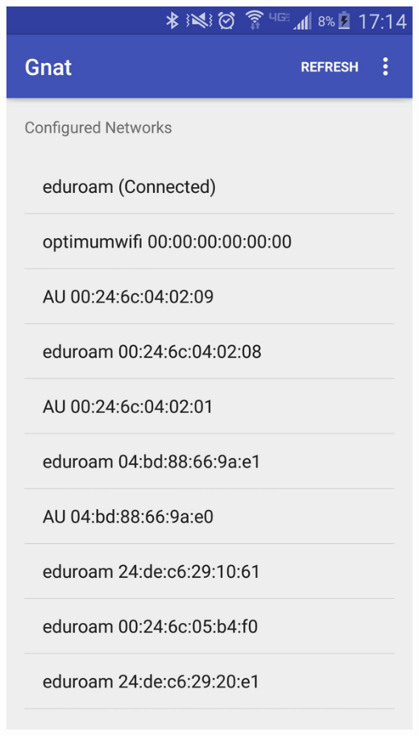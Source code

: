 \documentclass{scrreprt}
\begin{document}
\begin{center}
  \includegraphics[scale=0.3]{mainActivity.jpg}


\end{center}
\end{document}
